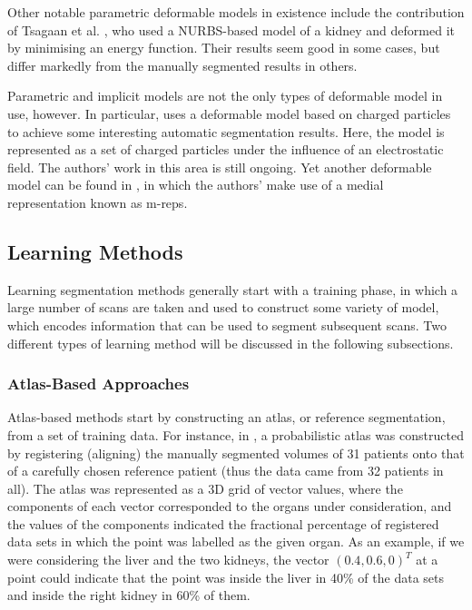 
Other notable parametric deformable models in existence include the contribution of Tsagaan et al. \cite{tsagaan02}, who used a NURBS-based model of a kidney and deformed it by minimising an energy function. Their results seem good in some cases, but differ markedly from the manually segmented results in others.

Parametric and implicit models are not the only types of deformable model in use, however. In particular, \cite{jalba04} uses a deformable model based on charged particles to achieve some interesting automatic segmentation results. Here, the model is represented as a set of charged particles under the influence of an electrostatic field. The authors' work in this area is still ongoing. Yet another deformable model can be found in \cite{pizer03}, in which the authors' make use of a medial representation known as m-reps.

\subsection{Learning Methods}

Learning segmentation methods generally start with a training phase, in which a large number of scans are taken and used to construct some variety of model, which encodes information that can be used to segment subsequent scans. Two different types of learning method will be discussed in the following subsections.

\subsubsection{Atlas-Based Approaches}


Atlas-based methods start by constructing an atlas, or reference segmentation, from a set of training data. For instance, in \cite{park03}, a probabilistic atlas was constructed by registering (aligning) the manually segmented volumes of 31 patients onto that of a carefully chosen reference patient (thus the data came from 32 patients in all). The atlas was represented as a 3D grid of vector values, where the components of each vector corresponded to the organs under consideration, and the values of the components indicated the fractional percentage of registered data sets in which the point was labelled as the given organ. As an example, if we were considering the liver and the two kidneys, the vector $(0.4, 0.6, 0)^T$ at a point could indicate that the point was inside the liver in 40\% of the data sets and inside the right kidney in 60\% of them.

